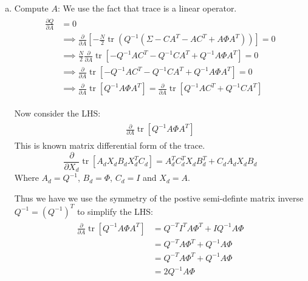 \documentclass{tufte-handout}
\begin{document}
\begin{enumerate}[(a)]
    \item Compute $A$:
    We use the fact that trace is a linear operator.   
    \begin{multline}
        \begin{aligned}
            \frac{\partial Q}{\partial A} &= 0 \\
             & \implies \frac{\partial}{\partial A} \left[ -\frac{N}{2} \operatorname{tr} \left( Q^{-1} (\Sigma - CA^{T} - AC^T + A \Phi A^T)  \right) \right]  = 0 \\
             &\implies \frac{N}{2} \frac{\partial}{\partial A} \operatorname{tr}\left[ -Q^{-1}AC^T   - Q^{-1}CA^T  + Q^{-1}A \Phi A^T   \right] = 0 \\ 
             &\implies \frac{\partial}{\partial A} \operatorname{tr}\left[ -Q^{-1}AC^T   - Q^{-1}CA^T + Q^{-1}A \Phi A^T   \right] = 0 \\ 
             &\implies \frac{\partial}{\partial A} \operatorname{tr}\left[ Q^{-1}A \Phi A^T   \right] = \frac{\partial}{\partial A} \operatorname{tr}\left[ Q^{-1}AC^T  + Q^{-1}CA^T  \right]  
        \end{aligned}
    \end{multline} 

    Now consider the LHS: 
    \begin{multline}
       \begin{aligned} 
            \frac{\partial}{\partial A} \operatorname{tr}\left[ Q^{-1}A \Phi A^T   \right]  
       \end{aligned}
    \end{multline}
    This is known matrix differential form of the trace.
    \begin{equation*}
       \frac{\partial}{\partial{X_d}} \operatorname{tr}\left[ A_dX_dB_dX_d^TC_d \right] = A_d^{T}C_d^{T}X_dB_d^{T} + C_dA_dX_dB_d 
    \end{equation*}
    Where $A_d = Q^{-1}$, $B_d = \Phi$, $C_d = I$ and $X_d = A$.

    Thus we have  we use the symmetry of the postive semi-definte matrix inverse   $Q^{-1} = (Q^{-1})^T$ to simplify the LHS:
    \begin{multline}
       \begin{aligned} 
            \frac{\partial}{\partial A} \operatorname{tr}\left[ Q^{-1}A \Phi A^T   \right]   &= Q^{-T} I^T A \Phi^T + I Q^{-1} A \Phi \\
            &= Q^{-T} A \Phi^T + Q^{-1} A \Phi \\
            &= Q^{-T} A \Phi^T + Q^{-1} A \Phi \\
            &= 2 Q^{-1} A \Phi \\
       \end{aligned}
    \end{multline}


\end{enumerate}
\end{document}
